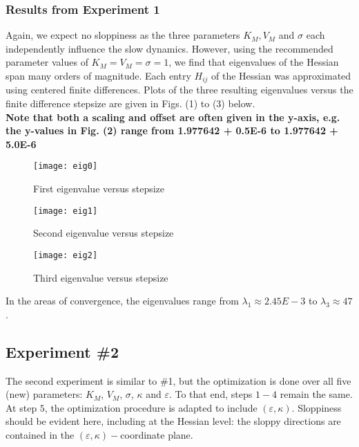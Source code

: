 \documentclass[11pt]{article}
\newcommand{\eps}{\varepsilon}
\begin{document}
\subsubsection{Results from Experiment 1}

Again, we expect no sloppiness as the three parameters $K_M, V_M$ and $\sigma$ each independently influence the slow dynamics. However, using the recommended parameter values of $K_M =  V_M = \sigma = 1$, we find that eigenvalues of the Hessian span many orders of magnitude. Each entry $H_{ij}$ of the Hessian was approximated using centered finite differences. Plots of the three resulting eigenvalues versus the finite difference stepsize are given in Figs. (1) to (3) below. \\

\textbf{Note that both a scaling and offset are often given in the y-axis, e.g. the y-values in Fig. (2) range from 1.977642 + 0.5E-6 to 1.977642 + 5.0E-6} \\

\begin{figure}[h!]
  \centering
  \texttt{[image: eig0]}
  \caption{First eigenvalue versus stepsize}
  \label{fig1}
\end{figure}

\begin{figure}[h!]
  \centering
  \texttt{[image: eig1]}
  \caption{Second eigenvalue versus stepsize}
  \label{fig1}
\end{figure}

\begin{figure}[h!]
  \centering
  \texttt{[image: eig2]}
  \caption{Third eigenvalue versus stepsize}
  \label{fig1}
\end{figure}

In the areas of convergence, the eigenvalues range from $\lambda_1 \approx 2.45E-3$ to $\lambda_3 \approx 47$.

\clearpage
\newpage

\subsection{Experiment \#2}
%
The second experiment is similar to \#1,
but the optimization is done over all five (new) parameters:
$K_M$, $V_M$, $\sigma$, $\kappa$ and $\eps$.
To that end, steps $1-4$ remain the same.
At step $5$, the optimization procedure is adapted
to include $(\eps,\kappa)$.
Sloppiness should be evident here, including at the Hessian level:
the sloppy directions are contained in
the $(\eps,\kappa)-$coordinate plane.
\end{document}
